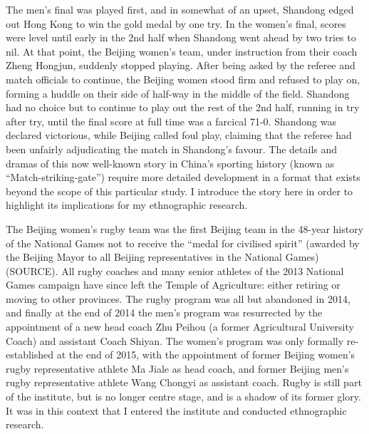 The men's final was played first, and in somewhat of an upset, Shandong edged out Hong Kong to win the gold medal by one try.  In the women's final, scores were level until early in the 2nd half when Shandong went ahead by two tries to nil.  At that point, the Beijing women's team, under instruction from their coach Zheng Hongjun, suddenly stopped playing.  After being asked by the referee and match officials to continue, the Beijing women stood firm and refused to play on, forming a huddle on their side of half-way in the middle of the field. Shandong had no choice but to continue to play out the rest of the 2nd half, running in try after try, until the final score at full time was a farcical 71-0.  Shandong was declared victorious, while Beijing called foul play, claiming that the referee had been unfairly adjudicating the match in Shandong's favour.  The details and dramas of this now well-known story in China's sporting history (known as ``Match-striking-gate'') require more detailed development in a format that exists beyond the scope of this particular study. I introduce the story here in order to highlight its implications for my ethnographic research.

The Beijing women's rugby team was the first Beijing team in the 48-year history of the National Games not to receive the ``medal for civilised spirit''  (awarded by the Beijing Mayor to all Beijing representatives in the National Games) (SOURCE).  All rugby coaches and many senior athletes of the 2013 National Games campaign have since left the Temple of Agriculture: either retiring or moving to other provinces.  The rugby program was all but abandoned in 2014, and finally at the end of 2014 the men's program was resurrected by the appointment of a new head coach Zhu Peihou (a former Agricultural University Coach) and assistant Coach Shiyan.  The women's program was only formally re-established at the end of 2015, with the appointment of former Beijing women's rugby representative athlete Ma Jiale as head coach, and former Beijing men's rugby representative athlete Wang Chongyi as assistant coach.  Rugby is still part of the institute, but is no longer centre stage, and is a shadow of its former glory.  It was in this context that I entered the institute and conducted ethnographic research.














